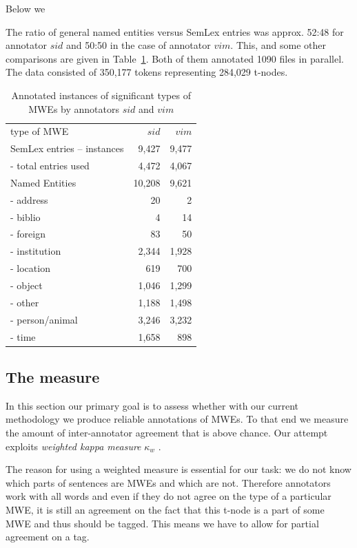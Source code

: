 Below we 

The ratio of general named entities versus SemLex entries was approx. 52:48 for annotator $sid$ and 50:50 in the case of annotator $vim$. This, and some other comparisons are given in Table~\ref{tab:anot}. Both of them annotated 1090 files in parallel. The data consisted of  350,177 tokens representing 284,029 t-nodes.

\begin{table}[h]
\centering
\begin{tabular}{l|r|r}
type of MWE&$sid$&$vim$\\
\cline{1-3}
SemLex entries -- instances&9,427&9,477\\
 - total entries used&4,472&4,067\\
Named Entities&10,208&9,621\\
 - address & 20 & 2 \\
 - biblio & 4 & 14 \\
 - foreign & 83 & 50 \\
 - institution&2,344&1,928\\
 - location&619&700\\
 - object&1,046&1,299\\
 - other&1,188&1,498\\
   - person/animal&3,246&3,232\\
      - time&1,658&898\\

\end{tabular}
\caption{Annotated instances of significant types of MWEs by annotators $sid$ and $vim$}
\label{tab:anot}
\end{table}


\subsection{The measure}
\label{agreement}

In this section our primary goal is to assess whether with our current methodology we produce reliable annotations of MWEs. To that end we measure the amount of inter-annotator agreement that is above chance. Our attempt exploits {\it weighted kappa measure} $\kappa_w$ \cite{cohen:1968}.

The reason for using a weighted measure is essential for our task: we do not know which parts of sentences are MWEs and which are not. Therefore annotators work with all words and even if they do not agree on the type of a particular MWE, it is still an agreement on the fact that this t-node is a part of some MWE and thus should be tagged. This means we have to allow for partial agreement on a tag.

